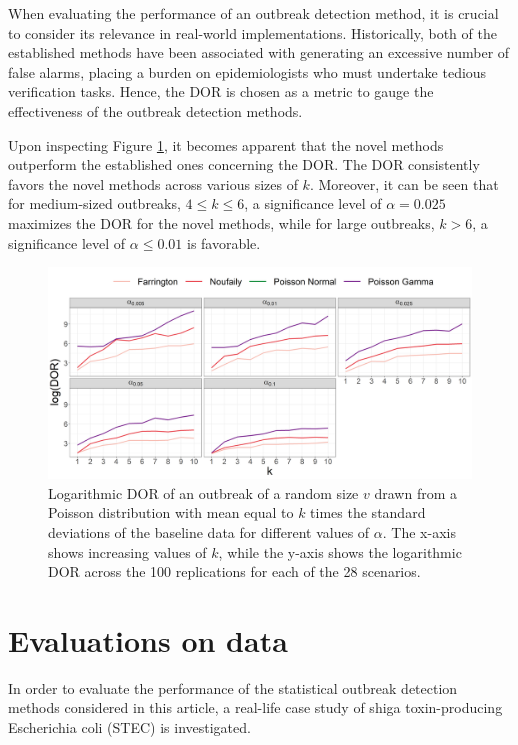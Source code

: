 \documentclass[preprint, 3p, authoryear]{elsarticle} %
\begin{document}
When evaluating the performance of an outbreak detection method, it is crucial to consider its relevance in real-world implementations. Historically, both of the established methods have been associated with generating an excessive number of false alarms, placing a burden on epidemiologists who must undertake tedious verification tasks. Hence, the DOR is chosen as a metric to gauge the effectiveness of the outbreak detection methods.

Upon inspecting Figure \ref{fig:logDORalpha}, it becomes apparent that the novel methods outperform the established ones concerning the DOR. The DOR consistently favors the novel methods across various sizes of \(k\). Moreover, it can be seen that for medium-sized outbreaks, \(4\leq k \leq 6\), a significance level of \(\alpha=0.025\) maximizes the DOR for the novel methods, while for large outbreaks, \(k>6\), a significance level of \(\alpha\leq 0.01\) is favorable.



\begin{figure}[H]
\includegraphics[width=1\linewidth]{../../figures/logDOR_alpha} \caption{Logarithmic DOR of an outbreak of a random size \(v\) drawn from a Poisson distribution with mean equal to \(k\) times the standard deviations of the baseline data for different values of \(\alpha\). The x-axis shows increasing values of \(k\), while the y-axis shows the logarithmic DOR across the 100 replications for each of the 28 scenarios.}\label{fig:logDORalpha}
\end{figure}

\hypertarget{evaluations-on-data}{%
\section{Evaluations on data}\label{evaluations-on-data}}

In order to evaluate the performance of the statistical outbreak detection methods considered in this article, a real-life case study of shiga toxin-producing Escherichia coli (STEC) is investigated.
\end{document}
